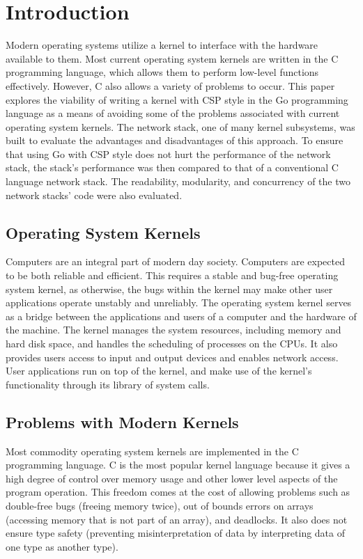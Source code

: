 \documentclass[twocolumn,10pt]{article}
\begin{document}
\section{Introduction}
Modern operating systems utilize a kernel to interface with the hardware available to them. Most current operating system kernels are written in the C programming language, which allows them to perform low-level functions effectively. However, C also allows a variety of problems to occur. This paper explores the viability of writing a kernel with CSP style in the Go programming language as a means of avoiding some of the problems associated with current operating system kernels. The network stack, one of many kernel subsystems, was built to evaluate the advantages and disadvantages of this approach. 
To ensure that using Go with CSP style does not hurt the performance of the network stack, the stack's performance was then compared to that of a conventional C language network stack.
The readability, modularity, and concurrency of the two network stacks' code were also evaluated.

\subsection{Operating System Kernels}
Computers are an integral part of modern day society. Computers are expected to be both reliable and efficient. This requires a stable and bug-free operating system kernel, as otherwise, the bugs within the kernel may make other user applications operate unstably and unreliably. 
The operating system kernel serves as a bridge between the applications and users of a computer and the hardware of the machine. The kernel manages the system resources, including memory and hard disk space, and handles the scheduling of processes on the CPUs. It also provides users access to input and output devices and enables network access. User applications run on top of the kernel, and make use of the kernel's functionality through its library of system calls.

\subsection{Problems with Modern Kernels}
Most commodity operating system kernels are implemented in the C programming language. C is the most popular kernel language because it gives a high degree of control over memory usage and other lower level aspects of the program operation. This freedom comes at the cost of allowing problems such as double-free bugs (freeing memory twice), out of bounds errors on arrays (accessing memory that is not part of an array), and deadlocks. It also does not ensure type safety (preventing misinterpretation of data by interpreting data of one type as another type). 
\end{document}
